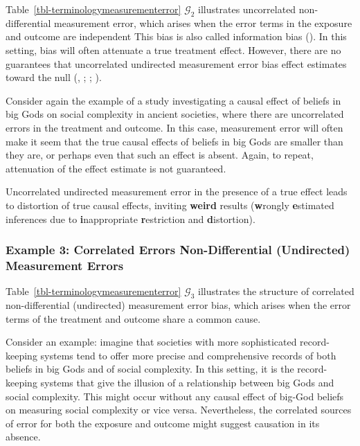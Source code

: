 \documentclass[
  single column]{article}
\begin{document}
Table~\ref{tbl-terminologymeasurementerror} \(\mathcal{G}_2\)
illustrates uncorrelated non-differential measurement error, which
arises when the error terms in the exposure and outcome are independent
This bias is also called information bias
(). In this
setting, bias will often attenuate a true treatment effect. However,
there are no guarantees that uncorrelated undirected measurement error
bias effect estimates toward the null
(,
;
;
).

Consider again the example of a study investigating a causal effect of
beliefs in big Gods on social complexity in ancient societies, where
there are uncorrelated errors in the treatment and outcome. In this
case, measurement error will often make it seem that the true causal
effects of beliefs in big Gods are smaller than they are, or perhaps
even that such an effect is absent. Again, to repeat, attenuation of the
effect estimate is not guaranteed.

Uncorrelated undirected measurement error in the presence of a true
effect leads to distortion of true causal effects, inviting
\textbf{weird} results (\textbf{w}rongly \textbf{e}stimated inferences
due to \textbf{i}nappropriate \textbf{r}estriction and
\textbf{d}istortion).

\subsubsection{Example 3: Correlated Errors Non-Differential
(Undirected) Measurement
Errors}\label{example-3-correlated-errors-non-differential-undirected-measurement-errors}

Table~\ref{tbl-terminologymeasurementerror} \(\mathcal{G}_3\)
illustrates the structure of correlated non-differential (undirected)
measurement error bias, which arises when the error terms of the
treatment and outcome share a common cause.

Consider an example: imagine that societies with more sophisticated
record-keeping systems tend to offer more precise and comprehensive
records of both beliefs in big Gods and of social complexity. In this
setting, it is the record-keeping systems that give the illusion of a
relationship between big Gods and social complexity. This might occur
without any causal effect of big-God beliefs on measuring social
complexity or vice versa. Nevertheless, the correlated sources of error
for both the exposure and outcome might suggest causation in its
absence.
\end{document}
